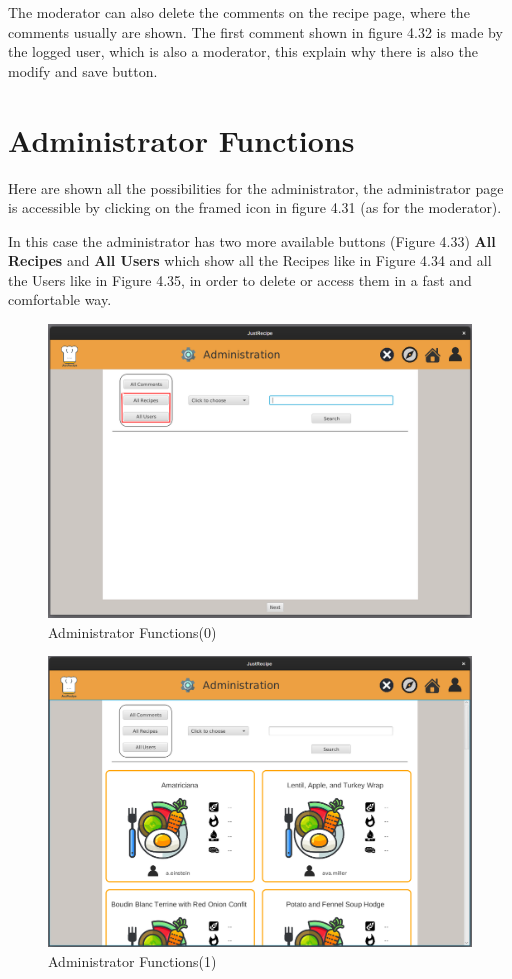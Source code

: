 \documentclass[a4paper]{report}
\begin{document}
\noindent The moderator can also delete the comments on the recipe page, where the comments usually are shown. The first comment shown in figure 4.32 is made by the logged user, which is also a moderator, this explain why there is also the modify and save button.

\section{Administrator Functions}
Here are shown all the possibilities for the administrator, the administrator page is accessible by clicking on the framed icon in figure 4.31 (as for the moderator).

\noindent In this case the administrator has two more available buttons (Figure 4.33) \textbf{All Recipes} and \textbf{All Users} which show all the Recipes like in Figure 4.34 and all the Users like in Figure 4.35, in order to delete or access them in a fast and comfortable way.
\begin{figure}[htpb]
	\centering
	\includegraphics[scale=0.37]{img/user_manual/administratorFunction0.png}
	\caption{Administrator Functions(0)}
\end{figure}
\begin{figure}[htpb]
	\centering
	\includegraphics[scale=0.37]{img/user_manual/administratorFunction1.png}
	\caption{Administrator Functions(1)}
\end{figure}
\end{document}
